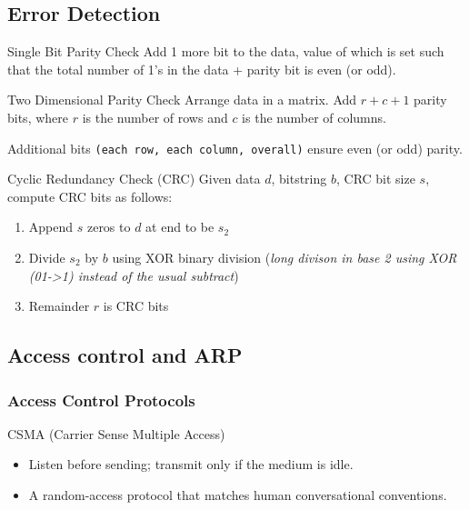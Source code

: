 \subsection{Error Detection}

\begin{theorem}
    {Single Bit Parity Check}
    Add 1 more bit to the data, value of which is set such that the total number of 1's in the data + parity bit is even (or odd).
\end{theorem}

\begin{theorem}
    {Two Dimensional Parity Check}
    Arrange data in a matrix. Add $r+c+1$ parity bits, where $r$ is the number of rows and $c$ is the number of columns.

    Additional bits \texttt{(each row, each column, overall)} ensure even (or odd) parity.
\end{theorem}

\begin{theorem}
    {Cyclic Redundancy Check (CRC)}
    Given data $d$, bitstring $b$, CRC bit size $s$, compute CRC bits as follows:
    \begin{enumerate}
        \item Append $s$ zeros to $d$ at end to be $s_2$
        \item Divide $s_2$ by $b$ using XOR binary division (\textit{long divison in base 2 using XOR (01->1) instead of the usual subtract})
        \item Remainder $r$ is CRC bits
    \end{enumerate}
\end{theorem}


\subsection{Access control and ARP}

\subsubsection{Access Control Protocols}

\begin{definition}
    {CSMA (Carrier Sense Multiple Access)}
    \begin{itemize}
        \item Listen before sending; transmit only if the medium is idle.
        \item A random-access protocol that matches human conversational conventions.
    \end{itemize}
\end{definition}

